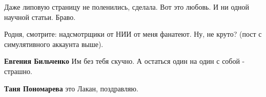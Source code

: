 \begin{itemize}
\begin{itemize}

Даже липовую страницу не поленились, сделала. Вот это любовь. И ни одной
научной статьи. Браво.

\end{itemize}

Родня, смотрите: надсмотрщики от НИИ от меня фанатеют. Ну, не круто? (пост с симулятивного аккаунта выше).


\begin{itemize}
\textbf{Евгения Бильченко} Им без тебя скучно. А остаться один на один с собой - страшно.

\textbf{Таня Пономарева} это Лакан, поздравляю.
\end{itemize}

\end{itemize}


